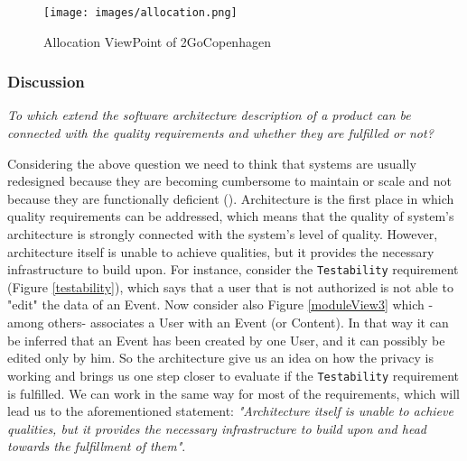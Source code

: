 \begin{figure}[H]
	\centering
	\texttt{[image: images/allocation.png]}
	\caption{Allocation ViewPoint of 2GoCopenhagen}
	\label{allocView}
\end{figure}


\subsubsection{Discussion}
\emph{To which extend the software architecture description of a product can be connected with the quality requirements and whether they are fulfilled or not?}

Considering the above question we need to think that systems are usually redesigned because they are becoming cumbersome to maintain or scale and not because they are functionally deficient (\cite{BassQuality}). Architecture is the first place in which quality requirements can be addressed, which means that the quality of system's architecture is strongly connected with the system's level of quality. However, architecture itself is unable to achieve qualities, but it provides the necessary infrastructure to build upon. For instance, consider the \verb|Testability| requirement (Figure \ref{testability}), which says that a user that is not authorized is not able to "edit" the data of an Event. Now consider also Figure \ref{moduleView3} which -among others- associates a User with an Event (or Content). In that way it can be inferred that an Event has been created by one User, and it can possibly be edited only by him. So the architecture give us an idea on how the privacy is working and brings us one step closer to evaluate if the \verb|Testability| requirement is fulfilled. We can work in the same way for most of the requirements, which will lead us to the aforementioned statement: \emph{"Architecture itself is unable to achieve qualities, but it provides the necessary infrastructure to build upon and head towards the fulfillment of them"}.
